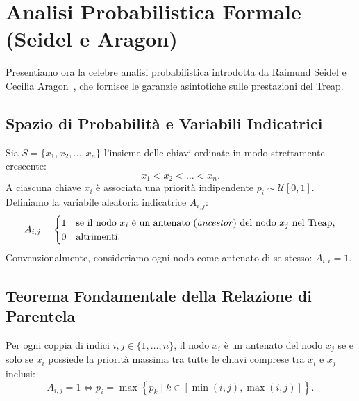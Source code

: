 \FloatBarrier
\section{Analisi Probabilistica Formale (Seidel e Aragon)}
\label{sec:probabilistic-analysis}

Presentiamo ora la celebre analisi probabilistica introdotta da Raimund Seidel e Cecilia Aragon~\cite{seidel1996}, che fornisce le garanzie asintotiche sulle prestazioni del Treap.

\subsection{Spazio di Probabilit\`a e Variabili Indicatrici}
Sia $S = \{x_1, x_2, \dots, x_n\}$ l'insieme delle chiavi ordinate in modo strettamente crescente:
\begin{equation}
  x_1 < x_2 < \dots < x_n.
\end{equation}
A ciascuna chiave $x_i$ \`e associata una priorit\`a indipendente $p_i \sim \mathcal{U}[0, 1]$.
Definiamo la variabile aleatoria indicatrice $A_{i, j}$:
\begin{equation}
  A_{i, j} = \begin{cases}
    1 & \text{se il nodo $x_i$ \`e un antenato (\textit{ancestor}) del nodo $x_j$ nel Treap,} \\
    0 & \text{altrimenti.}
  \end{cases}
\end{equation}
Convenzionalmente, consideriamo ogni nodo come antenato di se stesso: $A_{i, i} = 1$.

\subsection{Teorema Fondamentale della Relazione di Parentela}

\begin{theorem}
\label{thm:ancestor-condition}
Per ogni coppia di indici $i, j \in \{1, \dots, n\}$, il nodo $x_i$ \`e un antenato del nodo $x_j$ se e solo se $x_i$ possiede la priorit\`a massima tra tutte le chiavi comprese tra $x_i$ e $x_j$ inclusi:
\begin{equation}
  A_{i, j} = 1 \iff p_i = \max \left\{ p_k \mid k \in [\min(i, j), \max(i, j)] \right\}.
\end{equation}
\end{theorem}

